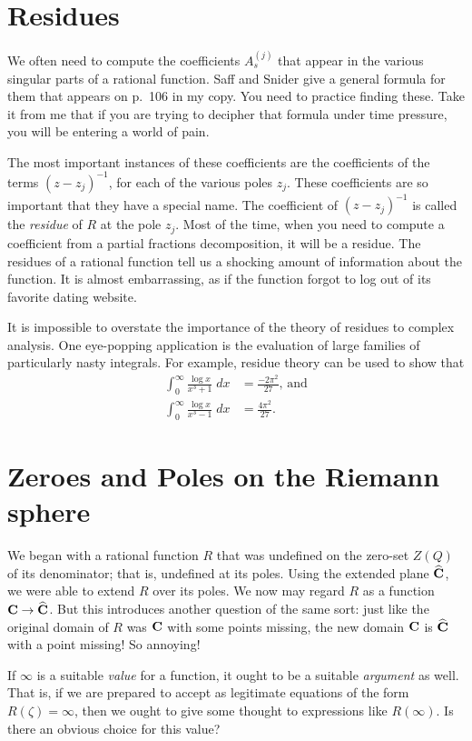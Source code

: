 \documentclass[twocolumn,12pt]{article}
\begin{document}
\section{Residues}
We often need to compute the coefficients $A^{(j)}_s$ that appear in the various singular parts of a rational function. Saff and Snider give a general formula for them that appears on p.\ 106 in my copy. You need to practice finding these. Take it from me that if you are trying to decipher that formula under time pressure, you will be entering a world of pain.

The most important instances of these coefficients are the coefficients of the terms $(z - z_j)^{-1}$, for each of the various poles $z_j$. These coefficients are so important that they have a special name. The coefficient of $(z - z_j)^{-1}$ is called the \emph{residue} of $R$ at the pole $z_j$. Most of the time, when you need to compute a coefficient from a partial fractions decomposition, it will be a residue. The residues of a rational function tell us a shocking amount of information about the function. It is almost embarrassing, as if the function forgot to log out of its favorite dating website.

It is impossible to overstate the importance of the theory of residues to complex analysis. One eye-popping application is the evaluation of large families of particularly nasty integrals. For example, residue theory can be used to show that
\begin{align*}
  \int_0^{\infty} \frac{\log x}{x^3 + 1} \; dx &= \frac{-2\pi^2}{27},\, \text{and}\\
  \int_0^{\infty} \frac{\log x}{x^3 - 1} \; dx &= \frac{4\pi^2}{27}.
\end{align*}

\section{Zeroes and Poles on the Riemann sphere}
We began with a rational function $R$ that was undefined on the zero-set $Z(Q)$ of its denominator; that is, undefined at its poles. Using the extended plane $\widehat{\mathbf{C}}$, we were able to extend $R$ over its poles. We now may regard $R$ as a function $\mathbf{C} \to \widehat{\mathbf{C}}$. But this introduces another question of the same sort: just like the original domain of $R$ was $\mathbf{C}$ with some points missing, the new domain $\mathbf{C}$ is $\widehat{\mathbf{C}}$ with a point missing! So annoying!

If $\infty$ is a suitable \emph{value} for a function, it ought to be a suitable \emph{argument} as well. That is, if we are prepared to accept as legitimate equations of the form $R(\zeta) = \infty$, then we ought to give some thought to expressions like $R(\infty)$. Is there an obvious choice for this value? 
\end{document}
